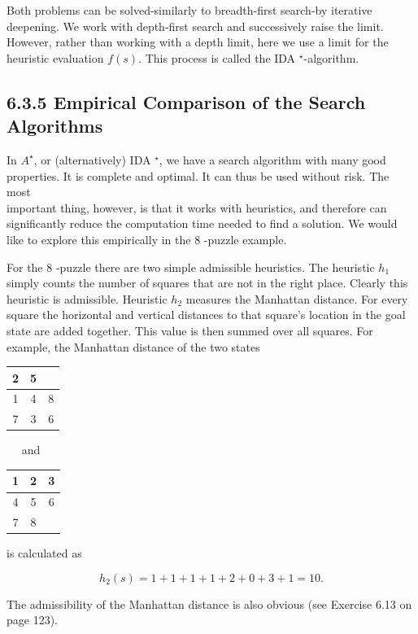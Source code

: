 \documentclass[10pt]{article}
\begin{document}
Both problems can be solved-similarly to breadth-first search-by iterative deepening. We work with depth-first search and successively raise the limit. However, rather than working with a depth limit, here we use a limit for the heuristic evaluation $f(s)$. This process is called the IDA ${ }^{\star}$-algorithm.

\subsection*{6.3.5 Empirical Comparison of the Search Algorithms}
In $A^{\star}$, or (alternatively) IDA ${ }^{\star}$, we have a search algorithm with many good properties. It is complete and optimal. It can thus be used without risk. The most\\
important thing, however, is that it works with heuristics, and therefore can significantly reduce the computation time needed to find a solution. We would like to explore this empirically in the 8 -puzzle example.


For the 8 -puzzle there are two simple admissible heuristics. The heuristic $h_{1}$ simply counts the number of squares that are not in the right place. Clearly this heuristic is admissible. Heuristic $h_{2}$ measures the Manhattan distance. For every square the horizontal and vertical distances to that square's location in the goal state are added together. This value is then summed over all squares. For example, the Manhattan distance of the two states

\begin{center}
\begin{tabular}{|c|c|c|}
\hline
2 & 5 &  \\
\hline
1 & 4 & 8 \\
\hline
7 & 3 & 6 \\
\hline\hline
\end{tabular}
\end{center}$\quad$ and $\quad$\begin{tabular}{|c|c|c|}
\hline
1 & 2 & 3 \\
\hline
4 & 5 & 6 \\
\hline
7 & 8 &  \\
\hline
\end{tabular}

is calculated as

$$
h_{2}(s)=1+1+1+1+2+0+3+1=10 .
$$

The admissibility of the Manhattan distance is also obvious (see Exercise 6.13 on page 123).
\end{document}
